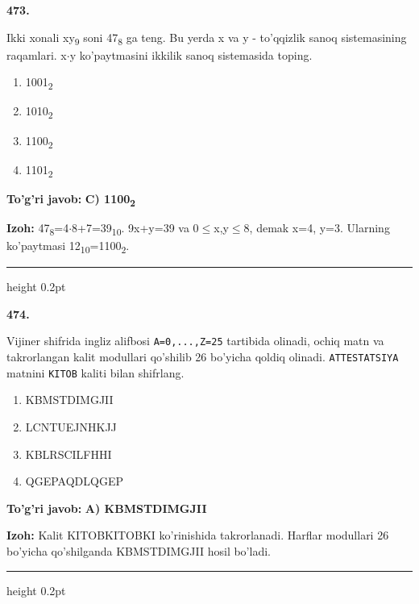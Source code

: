 \documentclass[10pt,a4paper,oneside]{article}
\begin{document}
\noindent\textbf{\color{ink}473.}
\par
Ikki xonali xy\textsubscript{9} soni 47\textsubscript{8} ga teng. Bu yerda x va y - to'qqizlik sanoq sistemasining raqamlari. x\ensuremath{\cdot}y ko'paytmasini ikkilik sanoq sistemasida toping.
\begin{enumerate}[label=\Alph*),leftmargin=9mm]
\item 1001\textsubscript{2}
\item 1010\textsubscript{2}
\item 1100\textsubscript{2}
\item 1101\textsubscript{2}
\end{enumerate}
\begin{tcolorbox}[enhanced,breakable,colback=teal!4,colframe=teal!50!black,boxrule=0.5pt,arc=1.1mm,left=3mm,right=3mm,top=1.7mm,bottom=1.7mm,before skip=2mm,after skip=2mm]
\textbf{\color{teal}To'g'ri javob:} \textbf{C) 1100\textsubscript{2}}
\par\smallskip
\textbf{Izoh:} 47\textsubscript{8}=4\ensuremath{\cdot}8+7=39\textsubscript{1}\textsubscript{0}. 9x+y=39 va 0\ensuremath{\leq}x,y\ensuremath{\leq}8, demak x=4, y=3. Ularning ko'paytmasi 12\textsubscript{1}\textsubscript{0}=1100\textsubscript{2}.
\end{tcolorbox}
\vspace{2mm}\hrule height 0.2pt \vspace{3mm}

\noindent\textbf{\color{ink}474.}
\par
Vijiner shifrida ingliz alifbosi \texttt{A=0,...,Z=25} tartibida olinadi, ochiq matn va takrorlangan kalit modullari qo'shilib 26 bo'yicha qoldiq olinadi. \texttt{ATTESTATSIYA} matnini \texttt{KITOB} kaliti bilan shifrlang.
\begin{enumerate}[label=\Alph*),leftmargin=9mm]
\item KBMSTDIMGJII
\item LCNTUEJNHKJJ
\item KBLRSCILFHHI
\item QGEPAQDLQGEP
\end{enumerate}
\begin{tcolorbox}[enhanced,breakable,colback=teal!4,colframe=teal!50!black,boxrule=0.5pt,arc=1.1mm,left=3mm,right=3mm,top=1.7mm,bottom=1.7mm,before skip=2mm,after skip=2mm]
\textbf{\color{teal}To'g'ri javob:} \textbf{A) KBMSTDIMGJII}
\par\smallskip
\textbf{Izoh:} Kalit KITOBKITOBKI ko'rinishida takrorlanadi. Harflar modullari 26 bo'yicha qo'shilganda KBMSTDIMGJII hosil bo'ladi.
\end{tcolorbox}
\vspace{2mm}\hrule height 0.2pt \vspace{3mm}
\end{document}
